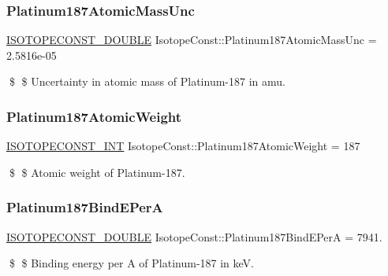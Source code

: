\subsubsection{\texorpdfstring{Platinum187\+Atomic\+Mass\+Unc}{Platinum187AtomicMassUnc}}
{\footnotesize\ttfamily \mbox{\hyperlink{group___isotope_const-_macros_ga8f45a7272ce02c0b4c65c44636ed719a}{I\+S\+O\+T\+O\+P\+E\+C\+O\+N\+S\+T\+\_\+\+D\+O\+U\+B\+LE}} Isotope\+Const\+::\+Platinum187\+Atomic\+Mass\+Unc = 2.\+5816e-\/05}

\$ \$ Uncertainty in atomic mass of Platinum-\/187 in amu. \mbox{\label{group___isotope_const-_platinum-_pt187_ga34312f01eed3504431cc5e96f2cb1be3}} 
\subsubsection{\texorpdfstring{Platinum187\+Atomic\+Weight}{Platinum187AtomicWeight}}
{\footnotesize\ttfamily \mbox{\hyperlink{group___isotope_const-_macros_ga5f18360b3e99483a35c32d789e62621c}{I\+S\+O\+T\+O\+P\+E\+C\+O\+N\+S\+T\+\_\+\+I\+NT}} Isotope\+Const\+::\+Platinum187\+Atomic\+Weight = 187}

\$ \$ Atomic weight of Platinum-\/187. \mbox{\label{group___isotope_const-_platinum-_pt187_ga3aa179ff446ff8d23635b3a77baba72c}} 
\subsubsection{\texorpdfstring{Platinum187\+Bind\+E\+PerA}{Platinum187BindEPerA}}
{\footnotesize\ttfamily \mbox{\hyperlink{group___isotope_const-_macros_ga8f45a7272ce02c0b4c65c44636ed719a}{I\+S\+O\+T\+O\+P\+E\+C\+O\+N\+S\+T\+\_\+\+D\+O\+U\+B\+LE}} Isotope\+Const\+::\+Platinum187\+Bind\+E\+PerA = 7941.}

\$ \$ Binding energy per A of Platinum-\/187 in keV. \mbox{\label{group___isotope_const-_platinum-_pt187_gad3568f0565151227081675b67d4835d6}} 
